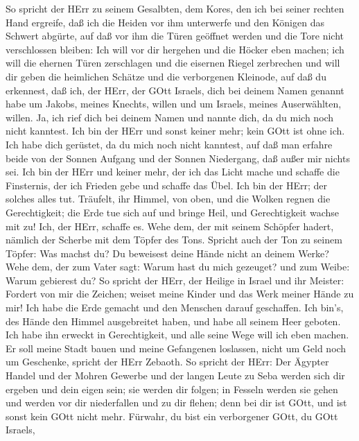  So spricht der HErr zu seinem Gesalbten, dem Kores, den ich
bei seiner rechten Hand ergreife, daß ich die Heiden vor ihm unterwerfe
und den Königen das Schwert abgürte, auf daß vor ihm die Türen geöffnet
werden und die Tore nicht verschlossen bleiben:  Ich will
vor dir hergehen und die Höcker eben machen; ich will die ehernen Türen
zerschlagen und die eisernen Riegel zerbrechen  und will dir
geben die heimlichen Schätze und die verborgenen Kleinode, auf daß du
erkennest, daß ich, der HErr, der GOtt Israels, dich bei deinem Namen
genannt habe  um Jakobs, meines Knechts, willen und um
Israels, meines Auserwählten, willen. Ja, ich rief dich bei deinem Namen
und nannte dich, da du mich noch nicht kanntest.  Ich bin
der HErr und sonst keiner mehr; kein GOtt ist ohne ich. Ich habe dich
gerüstet, da du mich noch nicht kanntest,  auf daß man
erfahre beide von der Sonnen Aufgang und der Sonnen Niedergang, daß
außer mir nichts sei. Ich bin der HErr und keiner mehr,  der
ich das Licht mache und schaffe die Finsternis, der ich Frieden gebe und
schaffe das Übel. Ich bin der HErr; der solches alles tut. 
Träufelt, ihr Himmel, von oben, und die Wolken regnen die Gerechtigkeit;
die Erde tue sich auf und bringe Heil, und Gerechtigkeit wachse mit zu!
Ich, der HErr, schaffe es.  Wehe dem, der mit seinem
Schöpfer hadert, nämlich der Scherbe mit dem Töpfer des Tons. Spricht
auch der Ton zu seinem Töpfer: Was machst du? Du beweisest deine Hände
nicht an deinem Werke?  Wehe dem, der zum Vater sagt: Warum
hast du mich gezeuget? und zum Weibe: Warum gebierest du? 
So spricht der HErr, der Heilige in Israel und ihr Meister: Fordert von
mir die Zeichen; weiset meine Kinder und das Werk meiner Hände zu mir!
 Ich habe die Erde gemacht und den Menschen darauf
geschaffen. Ich bin's, des Hände den Himmel ausgebreitet haben, und habe
all seinem Heer geboten.  Ich habe ihn erweckt in
Gerechtigkeit, und alle seine Wege will ich eben machen. Er soll meine
Stadt bauen und meine Gefangenen loslassen, nicht um Geld noch um
Geschenke, spricht der HErr Zebaoth.  So spricht der HErr:
Der Ägypter Handel und der Mohren Gewerbe und der langen Leute zu Seba
werden sich dir ergeben und dein eigen sein; sie werden dir folgen; in
Fesseln werden sie gehen und werden vor dir niederfallen und zu dir
flehen; denn bei dir ist GOtt, und ist sonst kein GOtt nicht mehr.
 Fürwahr, du bist ein verborgener GOtt, du GOtt Israels,
